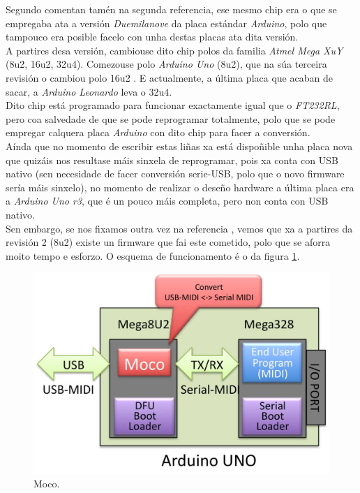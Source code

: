     Segundo comentan tamén na segunda referencia, ese mesmo chip era o que se
    empregaba ata a versión \textit{Duemilanove} \cite{ArduinoDuemilanove} da
    placa estándar \textit{Arduino}, polo que tampouco era posible facelo con
    unha destas placas ata dita versión. \\

    A partires desa versión, cambiouse dito chip polos da familia
    \textit{Atmel Mega XuY} (8u2, 16u2, 32u4). Comezouse polo
    \textit{Arduino Uno} (8u2), que na súa terceira revisión o cambiou polo
    16u2 \cite{ArduinoUno}. E actualmente, a última placa que acaban de sacar,
    a \textit{Arduino Leonardo} \cite{ArduinoLeonardo} leva o 32u4. \\

    Dito chip está programado para funcionar exactamente igual que o
    \textit{FT232RL}, pero coa salvedade de que se pode reprogramar totalmente,
    polo que se pode empregar calquera placa \textit{Arduino} con dito chip
    para facer a conversión. \\

    Aínda que no momento de escribir estas liñas xa está dispoñible unha placa
    nova \cite{ArduinoLeonardo} que quizáis nos resultase máis sinxela de
    reprogramar, pois xa conta con USB nativo (sen necesidade de facer
    conversión serie-USB, polo que o novo firmware sería máis sinxelo), no
    momento de realizar o deseño hardware a última placa era a
    \textit{Arduino Uno r3}, que é un pouco máis completa, pero non conta con
    USB nativo. \\

    Sen embargo, se nos fixamos outra vez na referencia \cite{Moco}, vemos que
    xa a partires da revisión 2 (8u2) existe un firmware que fai este cometido,
    polo que se aforra moito tempo e esforzo. O esquema de funcionamento é o da
    figura \ref{figura:Moco2}.

    \begin{figure}[htbp]
     \centering
     \includegraphics[scale=0.3,keepaspectratio=true]{./imagenes/moco.jpg}
     \caption{Moco.}
     \label{figura:Moco2}
    \end{figure}

